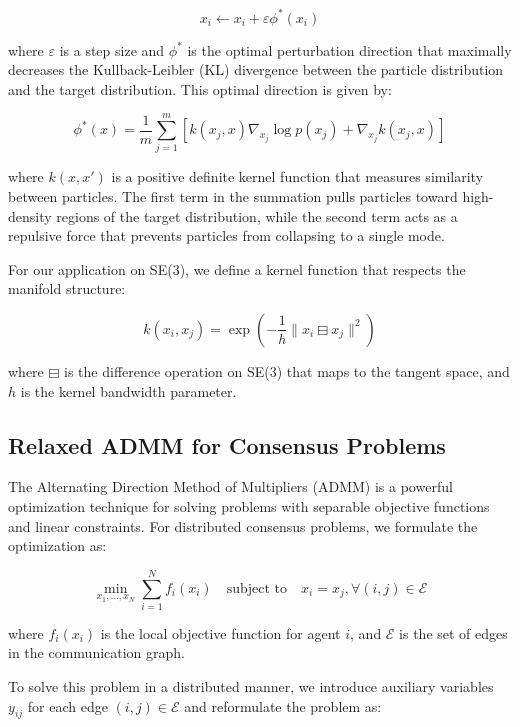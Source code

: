 \documentclass[a4paper,fleqn,10pt,twocolumn]{SICE_ISCS}
\begin{document}
\begin{equation}
x_i \leftarrow x_i + \varepsilon \phi^*(x_i)
\end{equation}

where $\varepsilon$ is a step size and $\phi^*$ is the optimal perturbation direction that maximally decreases the Kullback-Leibler (KL) divergence between the particle distribution and the target distribution. This optimal direction is given by:

\begin{equation}
\phi^*(x) = \frac{1}{m} \sum_{j=1}^m [k(x_j, x) \nabla_{x_j} \log p(x_j) + \nabla_{x_j} k(x_j, x)]
\end{equation}

where $k(x, x')$ is a positive definite kernel function that measures similarity between particles. The first term in the summation pulls particles toward high-density regions of the target distribution, while the second term acts as a repulsive force that prevents particles from collapsing to a single mode.

For our application on SE(3), we define a kernel function that respects the manifold structure:

\begin{equation}
k(x_i, x_j) = \exp(-\frac{1}{h} \|x_i \boxminus x_j\|^2)
\end{equation}

where $\boxminus$ is the difference operation on SE(3) that maps to the tangent space, and $h$ is the kernel bandwidth parameter.

\subsection{Relaxed ADMM for Consensus Problems}

The Alternating Direction Method of Multipliers (ADMM) is a powerful optimization technique for solving problems with separable objective functions and linear constraints. For distributed consensus problems, we formulate the optimization as:

\begin{equation}
\min_{x_1, \ldots, x_N} \sum_{i=1}^N f_i(x_i) \quad \text{subject to} \quad x_i = x_j, \forall (i,j) \in \mathcal{E}
\end{equation}

where $f_i(x_i)$ is the local objective function for agent $i$, and $\mathcal{E}$ is the set of edges in the communication graph.

To solve this problem in a distributed manner, we introduce auxiliary variables $y_{ij}$ for each edge $(i,j) \in \mathcal{E}$ and reformulate the problem as:
\end{document}
